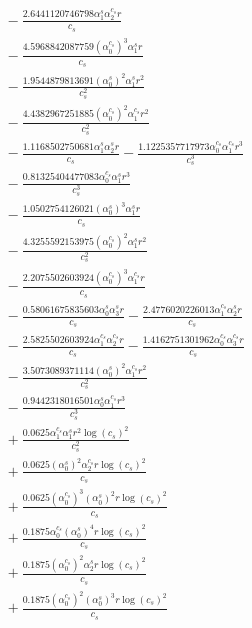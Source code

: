 \documentclass[10pt]{article}
\begin{document}
\begin{align*}
&{}  - \frac{2.6441120746798 \alpha_{1}^s \alpha_{2}^{c_s} r}{c_{s}} \\
&{}  - \frac{4.5968842087759 \left(\alpha_{0}^{c_s}\right)^{3} \alpha_{1}^s r}{c_{s}} \\
&{}  - \frac{1.9544879813691 \left(\alpha_{0}^s\right)^{2} \alpha_{1}^s r^{2}}{c_{s}^{2}} \\
&{}  - \frac{4.4382967251885 \left(\alpha_{0}^{c_s}\right)^{2} \alpha_{1}^{c_s} r^{2}}{c_{s}^{2}} \\
&{}  - \frac{1.1168502750681 \alpha_{1}^s \alpha_{2}^s r}{c_{s}} - \frac{1.1225357717973 \alpha_{0}^{c_s} \alpha_{1}^{c_s} r^{3}}{c_{s}^{3}} \\
&{}  - \frac{0.81325404477083 \alpha_{0}^{c_s} \alpha_{1}^s r^{3}}{c_{s}^{3}} \\
&{}  - \frac{1.0502754126021 \left(\alpha_{0}^s\right)^{3} \alpha_{1}^s r}{c_{s}} \\
&{}  - \frac{4.3255592153975 \left(\alpha_{0}^{c_s}\right)^{2} \alpha_{1}^s r^{2}}{c_{s}^{2}} \\
&{}  - \frac{2.2075502603924 \left(\alpha_{0}^{c_s}\right)^{3} \alpha_{1}^{c_s} r}{c_{s}} \\
&{}  - \frac{0.58061675835603 \alpha_{0}^s \alpha_{3}^s r}{c_{s}} - \frac{2.4776020226013 \alpha_{1}^{c_s} \alpha_{2}^s r}{c_{s}} \\
&{}  - \frac{2.5825502603924 \alpha_{1}^{c_s} \alpha_{2}^{c_s} r}{c_{s}} - \frac{1.4162751301962 \alpha_{0}^{c_s} \alpha_{3}^{c_s} r}{c_{s}} \\
&{}  - \frac{3.5073089371114 \left(\alpha_{0}^s\right)^{2} \alpha_{1}^{c_s} r^{2}}{c_{s}^{2}} \\
&{}  - \frac{0.9442318016501 \alpha_{0}^s \alpha_{1}^{c_s} r^{3}}{c_{s}^{3}} \\
&{}  + \frac{0.0625 \alpha_{1}^{c_s} \alpha_{1}^s r^{2} \log{\left(c_{s} \right)}^{2}}{c_{s}^{2}} \\
&{}  + \frac{0.0625 \left(\alpha_{0}^s\right)^{2} \alpha_{2}^{c_s} r \log{\left(c_{s} \right)}^{2}}{c_{s}} \\
&{}  + \frac{0.0625 \left(\alpha_{0}^{c_s}\right)^{3} \left(\alpha_{0}^s\right)^{2} r \log{\left(c_{s} \right)}^{2}}{c_{s}} \\
&{}  + \frac{0.1875 \alpha_{0}^{c_s} \left(\alpha_{0}^s\right)^{4} r \log{\left(c_{s} \right)}^{2}}{c_{s}} \\
&{}  + \frac{0.1875 \left(\alpha_{0}^{c_s}\right)^{2} \alpha_{2}^s r \log{\left(c_{s} \right)}^{2}}{c_{s}} \\
&{}  + \frac{0.1875 \left(\alpha_{0}^{c_s}\right)^{2} \left(\alpha_{0}^s\right)^{3} r \log{\left(c_{s} \right)}^{2}}{c_{s}} \\

\end{align*}
\end{document}
